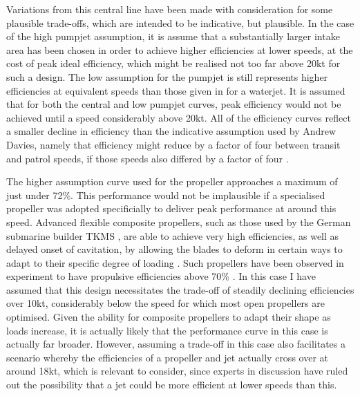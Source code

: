 \documentclass{article}\usepackage[]{graphicx}\usepackage[]{color}
\begin{document}
Variations from this central line have been made with consideration for some plausible trade-offs, which are intended to be indicative, but plausible.  In the case of the high pumpjet assumption, it is assume that a substantially larger intake area has been chosen in order to achieve higher efficiencies at lower speeds, at the cost of peak ideal efficiency, which might be realised not too far above 20kt for such a design.  The low assumption for the pumpjet is still represents higher efficiencies at equivalent speeds than those given in \cite{fujisawa1995} for a waterjet. It is assumed that for both the central and low pumpjet curves, peak efficiency would not be achieved until a speed considerably above 20kt.  All of the efficiency curves reflect a smaller decline in efficiency than the indicative assumption used by Andrew Davies, namely that efficiency might reduce by a factor of four between transit and patrol speeds, if those speeds also differed by a factor of four \cite{davies2017}.

The higher assumption curve used for the propeller approaches a maximum of just under 72\%.  This performance would not be implausible if a specialised propeller was adopted specificially to deliver peak performance at around this speed. Advanced flexible composite propellers, such as those used by the German submarine builder TKMS \parencite{durrant2016}, are able to achieve very high efficiencies, as well as delayed onset of cavitation, by allowing the blades to deform in certain ways to adapt to their specific degree of loading \parencite{young2007hydroelastic2}.  Such propellers have been observed in experiment to have propulsive efficiencies above 70\% \parencite{young2007hydroelastic}.  In this case I have assumed that this design necessitates the trade-off of steadily declining efficiencies over 10kt, considerably below the speed for which most open propellers are optimised.  Given the ability for composite propellers to adapt their shape as loads increase, it is actually likely that the performance curve in this case is actually far broader. However, assuming a trade-off in this case also facilitates a scenario whereby the efficiencies of a propeller and jet actually cross over at around 18kt, which is relevant to consider, since experts in discussion have ruled out the possibility that a jet could be more efficient at lower speeds than this.
\end{document}
